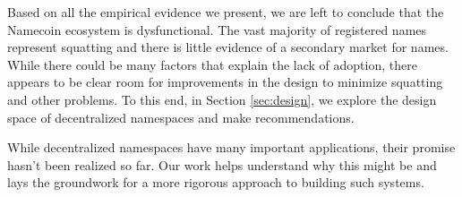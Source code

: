 
Based on all the empirical evidence we present, we are left to conclude that the Namecoin ecosystem is dysfunctional. The vast majority of registered names represent squatting and there is little evidence of a secondary market for names. While there could be many factors that explain the lack of adoption, there appears to be clear room for improvements in the design to minimize squatting and other problems. To this end, in Section \ref{sec:design}, we explore the design space of decentralized namespaces and make recommendations.

While decentralized namespaces have many important applications, their promise hasn't been realized so far. Our work helps understand why this might be and lays the groundwork for a more rigorous approach to building such systems.

